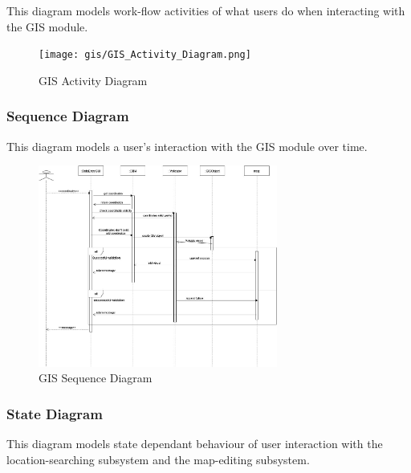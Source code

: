 This diagram models work-flow activities of what users do when interacting with the GIS module.



\begin{figure}[H]

		\centering

		\texttt{[image: gis/GIS\_Activity\_Diagram.png]}

		\caption{GIS Activity Diagram}

\end{figure}


\pagebreak


\subsubsection{Sequence Diagram}

This diagram models a user's interaction with the GIS module over time.

\begin{figure}[H]

		\centering

		\includegraphics[width=0.7\textwidth]{gis/GIS_Sequence.jpg}

		\caption{GIS Sequence Diagram}

\end{figure}



\pagebreak



\subsubsection{State Diagram}

This diagram models state dependant behaviour of user interaction with the location-searching subsystem and the map-editing subsystem.

